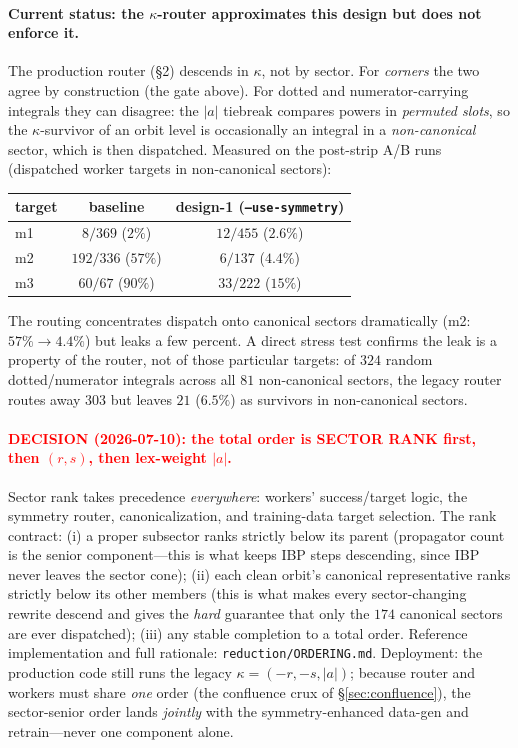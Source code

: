 \documentclass[11pt]{article}
\newcommand{\kk}{\kappa}
\newcommand{\code}[1]{\texttt{#1}}
\begin{document}
\paragraph{Current status: the $\kk$-router approximates this design but does not
enforce it.} The production router (\S2) descends in $\kk$, not by sector. For
\emph{corners} the two agree by construction (the gate above). For dotted and
numerator-carrying integrals they can disagree: the $|a|$ tiebreak compares powers in
\emph{permuted slots}, so the $\kk$-survivor of an orbit level is occasionally an
integral in a \emph{non-canonical} sector, which is then dispatched. Measured on the
post-strip A/B runs (dispatched worker targets in non-canonical sectors):
\begin{center}
\footnotesize
\begin{tabular}{lcc}
\toprule
target & baseline & design-1 (\code{--use-symmetry}) \\
\midrule
m1 & $8/369$ ($2\%$)    & $12/455$ ($2.6\%$) \\
m2 & $192/336$ ($57\%$) & $6/137$ ($4.4\%$)  \\
m3 & $60/67$ ($90\%$)   & $33/222$ ($15\%$)  \\
\bottomrule
\end{tabular}
\end{center}
The routing concentrates dispatch onto canonical sectors dramatically (m2:
$57\%\to4.4\%$) but leaks a few percent. A direct stress test confirms the leak is a
property of the router, not of those particular targets: of $324$ random
dotted/numerator integrals across all $81$ non-canonical sectors, the legacy router
routes away $303$ but leaves $21$ ($6.5\%$) as survivors in non-canonical sectors.

\paragraph{\textcolor{red}{DECISION (2026-07-10): the total order is SECTOR RANK
first, then $(r,s)$, then lex-weight $|a|$.}}
Sector rank takes precedence \emph{everywhere}: workers' success/target logic, the
symmetry router, canonicalization, and training-data target selection. The rank
contract: (i) a proper subsector ranks strictly below its parent (propagator count is
the senior component---this is what keeps IBP steps descending, since IBP never leaves
the sector cone); (ii) each clean orbit's canonical representative ranks strictly
below its other members (this is what makes every sector-changing rewrite descend and
gives the \emph{hard} guarantee that only the $174$ canonical sectors are ever
dispatched); (iii) any stable completion to a total order. Reference implementation
and full rationale: \code{reduction/ORDERING.md}. Deployment: the production code
still runs the legacy $\kk=(-r,-s,|a|)$; because router and workers must share
\emph{one} order (the confluence crux of \S\ref{sec:confluence}), the sector-senior
order lands \emph{jointly} with the symmetry-enhanced data-gen and retrain---never
one component alone.
\end{document}
